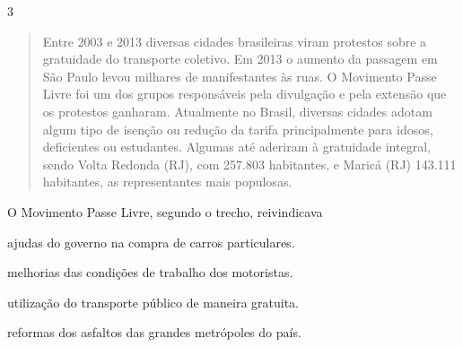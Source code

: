 
\num{3}

\begin{quote}
Entre 2003 e 2013 diversas cidades brasileiras viram protestos sobre a
gratuidade do transporte coletivo. Em 2013 o aumento da passagem em São
Paulo levou milhares de manifestantes às ruas. O Movimento Passe Livre
foi um dos grupos responsáveis pela divulgação e pela extensão que os
protestos ganharam. Atualmente no Brasil, diversas cidades adotam algum
tipo de isenção ou redução da tarifa principalmente para idosos,
deficientes ou estudantes. Algumas até aderiram à gratuidade integral,
sendo Volta Redonda (RJ), com 257.803 habitantes, e Maricá (RJ) 143.111
habitantes, as representantes mais populosas.

\end{quote}

O Movimento Passe Livre, segundo o trecho, reivindicava

\begin{escolha}
\item ajudas do governo na compra de carros particulares.

\item melhorias das condições de trabalho dos motoristas.

\item utilização do transporte público de maneira gratuita.

\item reformas dos asfaltos das grandes metrópoles do país.
\end{escolha}

